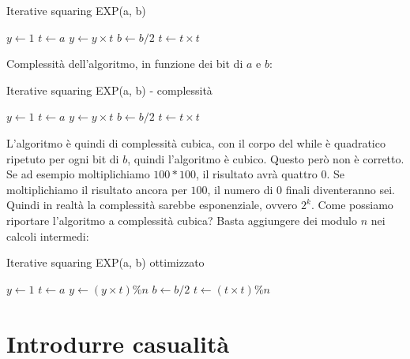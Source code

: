\begin{algorithm}[H]
\caption{Iterative squaring EXP(a, b)}\label{alg:cap}
\begin{algorithmic}
\State $y \gets 1$
\State $t \gets a$
    \State $y \gets y \times t$
\EndIf
    \State $b \gets b / 2$
    \State $t \gets t \times t$
\EndWhile
\end{algorithmic}
\end{algorithm}

\noindent Complessità dell'algoritmo, in funzione dei bit di $a$ e $b$:

\begin{algorithm}[H]
\caption{Iterative squaring EXP(a, b) - complessità}\label{alg:cap}
\begin{algorithmic}
\State $y \gets 1$ 
\State $t \gets a$ 
 
 
    \State $y \gets y \times t$ 
\EndIf
    \State $b \gets b / 2$ 
    \State $t \gets t \times t$ 
\EndWhile
\end{algorithmic}
\end{algorithm}

\noindent L'algoritmo è quindi di complessità cubica, con il corpo del while è quadratico ripetuto per ogni bit di $b$, quindi l'algoritmo è cubico. Questo però non è corretto. Se ad esempio moltiplichiamo  $100*100$, il risultato avrà quattro 0. Se moltiplichiamo il risultato ancora per $100$, il numero di 0 finali diventeranno sei. Quindi in realtà la complessità sarebbe esponenziale, ovvero $2^k$. Come possiamo riportare l'algoritmo a complessità cubica? Basta aggiungere dei modulo $n$ nei calcoli intermedi:

\begin{algorithm}[H]
\caption{Iterative squaring EXP(a, b) ottimizzato}\label{alg:cap}
\begin{algorithmic}
\State $y \gets 1$
\State $t \gets a$
    \State $y \gets (y \times t) \% n$
\EndIf
    \State $b \gets b / 2$
    \State $t \gets (t \times t) \% n$ 
\EndWhile
\end{algorithmic}
\end{algorithm}

\section{Introdurre casualità}


